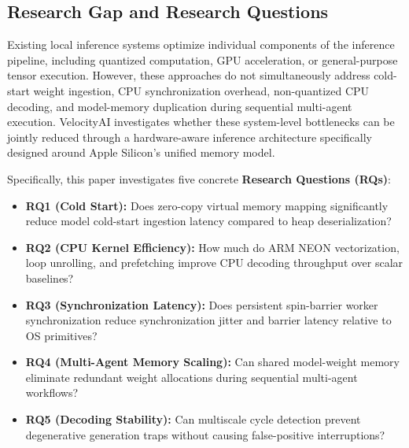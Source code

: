 \documentclass[10pt,twocolumn]{article}
\begin{document}
\subsection{Research Gap and Research Questions}
Existing local inference systems optimize individual components of the inference pipeline, including quantized computation, GPU acceleration, or general-purpose tensor execution. However, these approaches do not simultaneously address cold-start weight ingestion, CPU synchronization overhead, non-quantized CPU decoding, and model-memory duplication during sequential multi-agent execution. VelocityAI investigates whether these system-level bottlenecks can be jointly reduced through a hardware-aware inference architecture specifically designed around Apple Silicon's unified memory model.

Specifically, this paper investigates five concrete \textbf{Research Questions (RQs)}:
\begin{itemize}
    \item \textbf{RQ1 (Cold Start):} Does zero-copy virtual memory mapping significantly reduce model cold-start ingestion latency compared to heap deserialization?
    \item \textbf{RQ2 (CPU Kernel Efficiency):} How much do ARM NEON vectorization, loop unrolling, and prefetching improve CPU decoding throughput over scalar baselines?
    \item \textbf{RQ3 (Synchronization Latency):} Does persistent spin-barrier worker synchronization reduce synchronization jitter and barrier latency relative to OS primitives?
    \item \textbf{RQ4 (Multi-Agent Memory Scaling):} Can shared model-weight memory eliminate redundant weight allocations during sequential multi-agent workflows?
    \item \textbf{RQ5 (Decoding Stability):} Can multiscale cycle detection prevent degenerative generation traps without causing false-positive interruptions?
\end{itemize}
\end{document}
